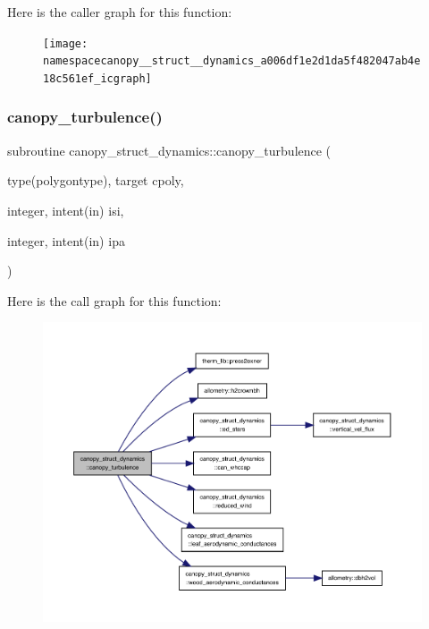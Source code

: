 Here is the caller graph for this function\+:
\nopagebreak
\begin{figure}[H]
\begin{center}
\leavevmode
\texttt{[image: namespacecanopy\_\_struct\_\_dynamics\_a006df1e2d1da5f482047ab4e18c561ef\_icgraph]}
\end{center}
\end{figure}
\mbox{\label{namespacecanopy__struct__dynamics_ac7eef4d24c3e07ccb461d418e32d466e}} 
\subsubsection{\texorpdfstring{canopy\+\_\+turbulence()}{canopy\_turbulence()}}
{\footnotesize\ttfamily subroutine canopy\+\_\+struct\+\_\+dynamics\+::canopy\+\_\+turbulence (\begin{DoxyParamCaption}\item[{type(polygontype), target}]{cpoly,  }\item[{integer, intent(in)}]{isi,  }\item[{integer, intent(in)}]{ipa }\end{DoxyParamCaption})}

Here is the call graph for this function\+:
\nopagebreak
\begin{figure}[H]
\begin{center}
\leavevmode
\includegraphics[width=350pt]{namespacecanopy__struct__dynamics_ac7eef4d24c3e07ccb461d418e32d466e_cgraph}
\end{center}
\end{figure}
\mbox{\label{namespacecanopy__struct__dynamics_ab65e289b4069536fa3342bc3034db824}} 
